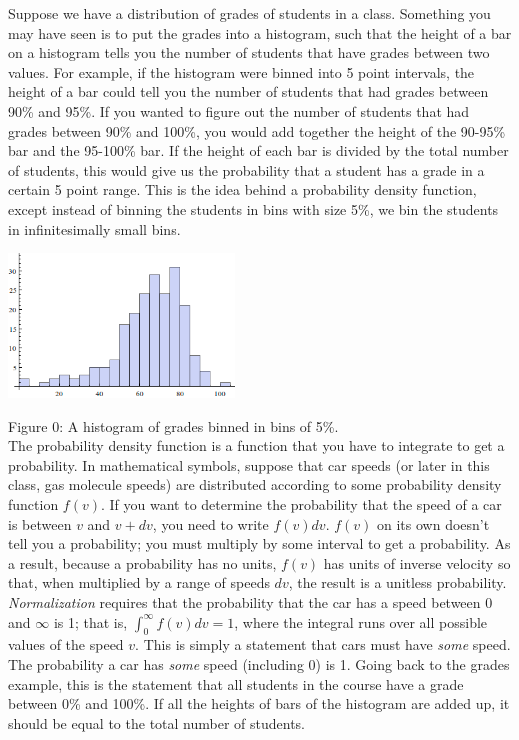 \documentclass[12pt]{book}
\begin{document}
\noindent Suppose we have a distribution of grades of students in a class. Something you may have seen is to put the grades into a histogram, such that the height of a bar on a histogram tells you the number of students that have grades between two values. For example, if the histogram were binned into 5 point intervals, the height of a bar could tell you the number of students that had grades between 90\% and 95\%.  If you wanted to figure out the number of students that had grades between 90\% and 100\%, you would add together the height of the 90-95\% bar and the 95-100\% bar. If the height of each bar is divided by the total number of students, this would give us the probability that a student has a grade in a certain 5 point range. This is the idea behind a probability density function, except instead of binning the students in bins with size 5\%, we bin the students in infinitesimally small bins.

\begin{center}
 \includegraphics[width=0.45\textwidth]{histogram.png}
\end{center}
Figure 0: A histogram of grades binned in bins of 5\%. \\


The probability density function is a function that you have to integrate to get a probability. In mathematical symbols, suppose that car speeds (or later in this class, gas molecule speeds) are distributed according to some probability density function $f(v)$. If you want to determine the probability that the speed of a car is between $v$ and $v+dv$, you need to write $f(v)dv$. $f(v)$ on its own doesn’t tell you a probability; you must multiply by some interval to get a probability. As a result, because a probability has no units, $f(v)$ has units of inverse velocity so that, when multiplied by a range of speeds $dv$, the result is a unitless probability. {\it Normalization} requires that the probability that the car has a speed between 0 and $\infty$ is 1; that is, $\int_0^\infty f (v)dv = 1$, where the integral runs over all possible values of the speed $v$. This is simply a statement that cars must have {\it some} speed. The probability a car has {\it some} speed (including 0) is 1. Going back to the 
grades example, this is the statement that all students in the course have a grade between 0\% and 100\%. If all the heights of bars of the histogram are added up, it should be equal to the total number of students.
\end{document}
